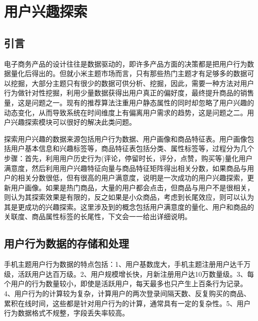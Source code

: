 
\chapter{用户兴趣探索}
\section{引言}
\label{chap:interestExplore}
电子商务产品的设计往往是数据驱动的，即许多产品方面的决策都是把用户行为数据量化后得出的。但就小米主题市场而言，只有那些热门主题才有足够多的数据可以挖掘，大部分主题只有很少的数据可供分析、挖掘，因此，需要一种方法对用户行为做针对性挖掘，利用少量数据获得出用户真正的偏好度，最终提升商品的销售量，这是问题之一。现有的推荐算法注重用户静态属性的同时却忽略了用户兴趣的动态变化，从而导致系统在时间维度上有偏离用户需求的趋势，这是问题之二。用户兴趣探索模块可以很好的解决此类问题。

探索用户兴趣的数据来源包括用户行为数据、用户画像和商品特征表。用户画像包括用户基本信息和兴趣标签等，商品特征表包括分类、属性标签等，过程分为几个步骤：首先，利用用户历史行为(评论，停留时长，评分，点赞，购买等)量化用户满意度，然后利用用户兴趣特征向量与商品特征矩阵得出相关分数，如果商品与用户的相关分数很低，但有很高的用户满意度，说明是一次成功的用户兴趣探索，更新用户画像。如果是热门商品，大量的用户都会点击，但商品与用户不是很相关，则认为其探索效果是有限的，反之如果是小众商品，考虑到长尾效应，则可以认为其是更成功的兴趣探索。这里涉及到的概念包括用户满意度的量化、用户和商品的关联度、商品属性标签的长尾性，下文会一一给出详细说明。

\section{用户行为数据的存储和处理}
手机主题用户行为数据的特点包括：1、用户基数庞大，手机主题注册用户达千万级，活跃用户达百万级。2、用户规模增长快，月新注册用户达10万数量级。3、每个用户的行为数量较小，即使是活跃用户，每天最多也只产生上百条行为记录。4、用户行为的计算较为复杂，计算用户的两次登录间隔天数、反复购买的商品、累积在线时间，这些都是针对用户行为的计算，通常具有一定的复杂性。5、用户行为数据格式不规整，字段丢失率较高。

